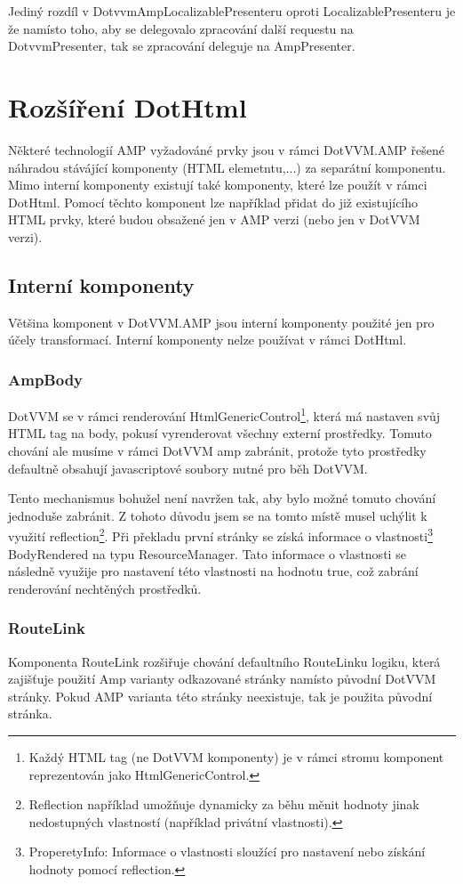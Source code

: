 Jediný rozdíl v DotvvmAmpLocalizablePresenteru oproti LocalizablePresenteru je že namísto toho, aby se delegovalo zpracování další requestu na DotvvmPresenter, tak se zpracování deleguje na AmpPresenter.

\section{Rozšíření DotHtml}

Některé technologií AMP vyžadováné prvky jsou v rámci DotVVM.AMP řešené náhradou stávájící komponenty (HTML elemetntu,...) za separátní komponentu.  Mimo interní komponenty existují také komponenty, které lze použít v rámci DotHtml. Pomocí těchto komponent lze například přidat do již existujícího HTML prvky, 
 které budou obsažené jen v AMP verzi (nebo jen v DotVVM verzi).
 
\subsection*{Interní komponenty}
Většina komponent v DotVVM.AMP jsou interní komponenty použité jen pro účely transformací. Interní komponenty nelze používat v rámci DotHtml.

\subsubsection*{AmpBody}
DotVVM se v rámci renderování HtmlGenericControl\footnote{Každý HTML tag (ne DotVVM komponenty) je v rámci stromu komponent reprezentován jako HtmlGenericControl.}, která má nastaven svůj HTML tag na body, pokusí vyrenderovat všechny externí prostředky. Tomuto chování ale musíme v rámci DotVVM amp zabránit, protože tyto prostředky defaultně obsahují javascriptové soubory nutné pro běh DotVVM.

Tento mechanismus bohužel není navržen tak, aby bylo možné tomuto chování jednoduše zabránit. Z tohoto důvodu jsem se na tomto místě musel uchýlit k využití reflection\footnote{Reflection například umožňuje dynamicky za běhu měnit hodnoty jinak nedostupných vlastností (například privátní vlastnosti).}. Při překladu první stránky se získá informace o vlastnosti\footnote{ProperetyInfo: Informace o vlastnosti sloužící pro nastavení nebo získání hodnoty pomocí reflection.} BodyRendered na typu ResourceManager. Tato informace o vlastnosti se následně využije pro nastavení této vlastnosti na hodnotu true, což zabrání renderování nechtěných prostředků.

\subsubsection*{RouteLink}
Komponenta RouteLink rozšiřuje chování defaultního RouteLinku logiku, která zajišťuje použití Amp varianty odkazované stránky namísto původní DotVVM stránky. Pokud AMP varianta této stránky neexistuje, tak je použita původní stránka.

